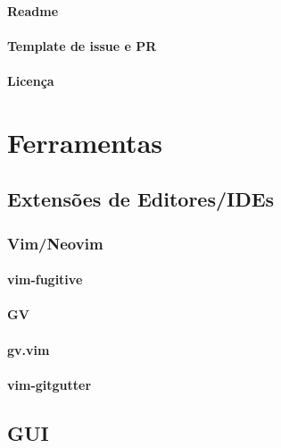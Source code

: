 \documentclass{apostila}
\begin{document}
\subsubsection{Readme}
\subsubsection{Template de issue e PR}
\subsubsection{Licença}

\chapter{Ferramentas}
\section{Extensões de Editores/IDEs}
\subsection{Vim/Neovim}
\subsubsection{vim-fugitive}
\subsubsection{GV}
\subsubsection{gv.vim}
\subsubsection{vim-gitgutter}

\section{GUI}
\end{document}
